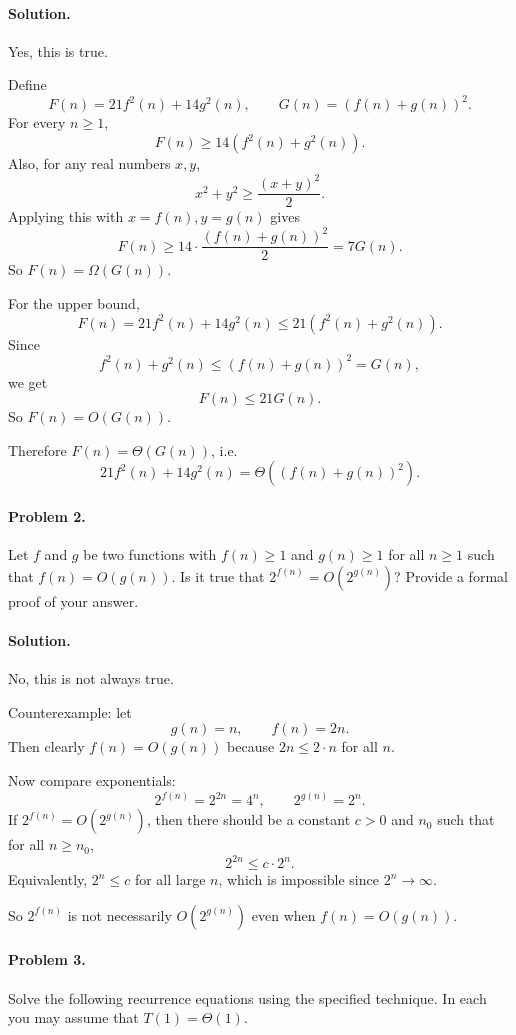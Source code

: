 \documentclass[10pt]{article}
\begin{document}
\paragraph{Solution.}
Yes, this is true.

Define
\[
F(n)=21f^2(n)+14g^2(n), \qquad G(n)=(f(n)+g(n))^2.
\]
For every $n\ge 1$,
\[
F(n)\ge 14(f^2(n)+g^2(n)).
\]
Also, for any real numbers $x,y$,
\[
x^2+y^2 \ge \frac{(x+y)^2}{2}.
\]
Applying this with $x=f(n), y=g(n)$ gives
\[
F(n)\ge 14\cdot \frac{(f(n)+g(n))^2}{2}=7G(n).
\]
So $F(n)=\Omega(G(n))$.

For the upper bound,
\[
F(n)=21f^2(n)+14g^2(n)\le 21(f^2(n)+g^2(n)).
\]
Since
\[
f^2(n)+g^2(n)\le (f(n)+g(n))^2=G(n),
\]
we get
\[
F(n)\le 21G(n).
\]
So $F(n)=O(G(n))$.

Therefore $F(n)=\Theta(G(n))$, i.e.
\[
21f^2(n)+14g^2(n)=\Theta((f(n)+g(n))^2).
\]

\paragraph{Problem 2.} Let $f$ and $g$ be two functions with $f(n) \geq 1$ and $g(n) \geq 1$ for all $n \geq 1$ such that $f(n) = O(g(n))$.  Is it true that $2^{f(n)} = O(2^{g(n)})$?  Provide a formal proof of your answer.
\paragraph{Solution.}
No, this is not always true.

Counterexample: let
\[
g(n)=n,\qquad f(n)=2n.
\]
Then clearly $f(n)=O(g(n))$ because $2n\le 2\cdot n$ for all $n$.

Now compare exponentials:
\[
2^{f(n)}=2^{2n}=4^n,\qquad 2^{g(n)}=2^n.
\]
If $2^{f(n)}=O(2^{g(n)})$, then there should be a constant $c>0$ and $n_0$ such that for all $n\ge n_0$,
\[
2^{2n}\le c\cdot 2^n.
\]
Equivalently, $2^n\le c$ for all large $n$, which is impossible since $2^n\to\infty$.

So $2^{f(n)}$ is not necessarily $O(2^{g(n)})$ even when $f(n)=O(g(n))$.

\paragraph{Problem 3.} Solve the following recurrence equations using the specified technique.  In each you may assume that $T(1) = \Theta(1)$.
\end{document}

